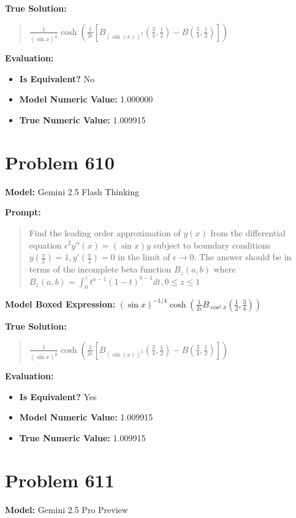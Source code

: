 \documentclass{article}
\begin{document}
\textbf{True Solution:}
\begin{quote}
$\frac{1}{(\sin x)^{\frac{1}{4}}} \cosh \left(\frac{1}{2 \epsilon}\left[B_{(\sin(x))^2}\left(\frac{3}{4}, \frac{1}{2}\right)-B\left(\frac{3}{4}, \frac{1}{2}\right)\right]\right)$
\end{quote}

\textbf{Evaluation:}
\begin{itemize}
\item \textbf{Is Equivalent?} No
\item \textbf{Model Numeric Value:} 1.000000
\item \textbf{True Numeric Value:} 1.009915
\end{itemize}
\vspace{1cm}
\section*{Problem 610}
\textbf{Model:} Gemini 2.5 Flash Thinking

\textbf{Prompt:}
\begin{quote}
Find the leading order approximation of $y(x)$ from the differential equation $\epsilon^2 y''(x)=(\sin x) y$ subject to boundary conditions $y(\frac{\pi}{2}) = 1, y'(\frac{\pi}{2}) = 0$ in the limit of $\epsilon \to 0$. The answer should be in terms of the incomplete beta function $B_z(a, b)$ where $B_z(a, b)=\int_0^z t^{a-1}(1-t)^{b-1} d t, 0 \leq z \leq 1$
\end{quote}
\textbf{Model Boxed Expression:} $(\sin x)^{-1/4} \cosh\left(\frac{1}{2\epsilon} B_{\cos^2 x}\left(\frac{1}{2}, \frac{3}{4}\right)\right)$

\textbf{True Solution:}
\begin{quote}
$\frac{1}{(\sin x)^{\frac{1}{4}}} \cosh \left(\frac{1}{2 \epsilon}\left[B_{(\sin(x))^2}\left(\frac{3}{4}, \frac{1}{2}\right)-B\left(\frac{3}{4}, \frac{1}{2}\right)\right]\right)$
\end{quote}

\textbf{Evaluation:}
\begin{itemize}
\item \textbf{Is Equivalent?} Yes
\item \textbf{Model Numeric Value:} 1.009915
\item \textbf{True Numeric Value:} 1.009915
\end{itemize}
\vspace{1cm}
\section*{Problem 611}
\textbf{Model:} Gemini 2.5 Pro Preview
\end{document}
